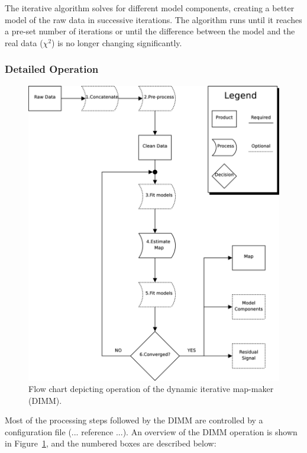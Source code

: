 \documentclass[twoside,11pt]{article}
\renewcommand{\_}{\texttt{\symbol{95}}}
\begin{document}
The iterative algorithm solves for different model components,
creating a better model of the raw data in successive iterations. The
algorithm runs until it reaches a pre-set number of iterations or
until the difference between the model and the real data ($\chi^2$) is
no longer changing significantly.

\subsubsection{Detailed Operation}

\begin{figure}
\begin{center}
\includegraphics[width=\linewidth]{sun258_dimm_flow.eps}
\caption{Flow chart depicting operation of the dynamic iterative
  map-maker (DIMM).}
\label{fig:dimm_flow}
\end{center}
\end{figure}

Most of the processing steps followed by the DIMM are controlled by a
configuration file (... reference ...). An overview of the DIMM
operation is shown in Figure~\ref{fig:dimm_flow}, and the numbered
boxes are described below:
\end{document}
